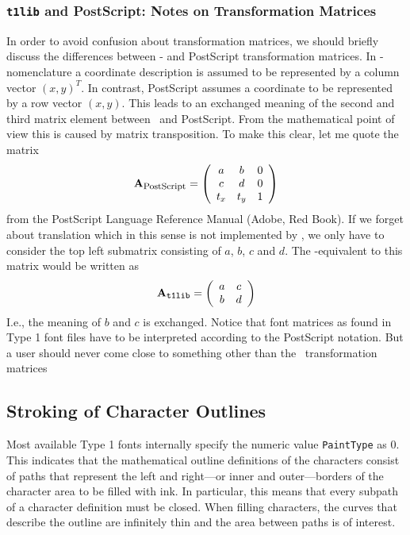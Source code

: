 \subsubsection{{\tt t1lib} and PostScript: Notes on Transformation Matrices}
In order to avoid confusion about transformation matrices, we should briefly
discuss the differences between \tonelib- and PostScript transformation
matrices. In \tonelib-nomenclature a coordinate description is assumed to be
represented by a column vector $(x,y)^T$. In contrast, PostScript assumes a
coordinate to be represented by a row vector $(x,y)$. This leads to an
exchanged meaning of the second and third matrix element between \tonelib\ and
PostScript. From the mathematical point of view this is caused by matrix
transposition. To make this clear, let me quote the matrix 
\begin{displaymath}
\mathbf{A}_{\mbox{\footnotesize PostScript}}=
\left( 
\begin{array}{ccc}
a & b & 0\\
c & d & 0\\
t_x & t_y & 1
\end{array}
\right)
\end{displaymath}
from the PostScript Language Reference Manual (Adobe, Red Book). If we forget
about translation which in this sense is not implemented by \tonelib, we only
have to consider the top left submatrix consisting of $a$, $b$, $c$ and $d$.
The \tonelib-equivalent to this matrix would be written as
\begin{displaymath}
\mathbf{A}_{\mbox{\tt\footnotesize t1lib}}=
\left( 
\begin{array}{cc}
a & c \\
b & d \\
\end{array}
\right)
\end{displaymath}
I.e., the meaning of $b$ and $c$ is exchanged. Notice that font matrices as
found in Type 1 font files have to be interpreted according to the PostScript
notation. But a user should never come close to something other than the
\tonelib\ transformation matrices


\subsection{Stroking of Character Outlines}
\label{stroking}%
Most available Type 1 fonts internally specify the numeric value
\verb+PaintType+ as $0$. This indicates that the mathematical outline
definitions of the characters consist of paths that represent the left and
right---or inner and outer---borders of the character area to be filled with
ink. In particular, this means that every subpath of a character definition
must be closed. When filling characters, the curves that describe the outline
are infinitely thin and the area between paths is of interest. 

